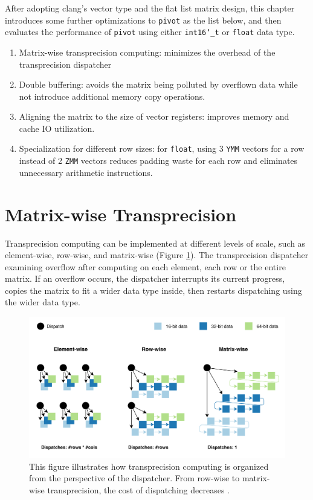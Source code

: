 \documentclass[logo,bsc,singlespacing,parskip]{infthesis}
\newcommand{\dtshort}{\texttt{int16\char`_t}}
\newcommand{\dtfloat}{\texttt{float}}
\newcommand{\mxcsr}{\texttt{mxcsr}}
\newcommand{\pivot}{\texttt{pivot}}
\newcommand{\ymm}{\texttt{YMM}}
\newcommand{\zmm}{\texttt{ZMM}}
\begin{document}
After adopting clang's vector type and the flat list matrix design, this chapter
introduces some further optimizations to \pivot{} as the list below, and then
evaluates the performance of \pivot{} using either \dtshort{} or \dtfloat{} data
type.

\begin{enumerate} 
    \item Matrix-wise transprecision computing: minimizes the overhead
    of the transprecision dispatcher
    \item Double buffering: avoids the matrix being polluted by overflown data
    while not introduce additional memory copy operations. 
    \item Aligning the matrix to the size of vector registers: improves memory
    and cache IO utilization.
    \item Specialization for different row sizes: for \dtfloat{}, using 3 \ymm{}
    vectors for a row instead of 2 \zmm{} vectors reduces padding waste for each
    row and eliminates unnecessary arithmetic instructions.
\end{enumerate}


\section{Matrix-wise Transprecision}
Transprecision computing can be implemented at different levels of scale, such
as element-wise, row-wise, and matrix-wise (Figure
\ref{fig:transprecision-dispatch}). The transprecision dispatcher examining
overflow after computing on each element, each row or the entire matrix. If an
overflow occurs, the dispatcher interrupts its current progress, copies the 
matrix to fit a wider data type inside, then restarts dispatching using the wider
data type. 

\begin{figure}[H]
\begin{center}
    \includegraphics[width=\linewidth]{image/transprecision-dispatch.png}
    \caption{This figure illustrates how transprecision computing is organized
    from the perspective of the dispatcher. From row-wise to matrix-wise 
    transprecision, the cost of dispatching decreases \cite{FPL1}.}
    \label{fig:transprecision-dispatch}
\end{center}
\end{figure}
\end{document}
